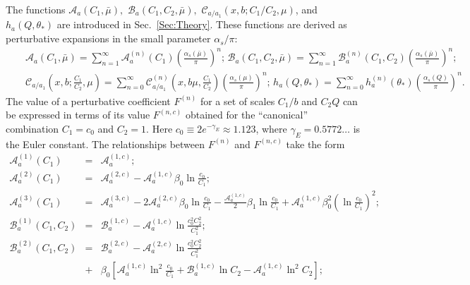 \documentclass[12pt,english,aps,preprint,prd,letterpaper,fleqn,nofootinbib,showpacs,showkeys,tightenlines,floatfix]{revtex4}
\begin{document}
{The functions $\mathcal{A}_{a}(C_{1},\bar{\mu}),$ $\mathcal{B}_{a}(C_{1},C_{2},\bar{\mu}),$
$\mathcal{C}_{a/a_{1}}(x,b;C_{1}/C_{2},\mu)$, and $h_{a}(Q,\theta_{*})$
are introduced in Sec.~\ref{Sec:Theory}. These functions are derived
as perturbative expansions in the small parameter $\alpha_{s}/\pi$:\begin{eqnarray*}
 &  & \mathcal{A}_{a}(C_{1},\bar{\mu})=\sum_{n=1}^{\infty}\mathcal{A}_{a}^{(n)}(C_{1})\left(\frac{\alpha_{s}(\bar{\mu})}{\pi}\right)^{n};\,\mathcal{B}_{a}(C_{1},C_{2},\bar{\mu})=\sum_{n=1}^{\infty}\mathcal{B}_{a}^{(n)}(C_{1},C_{2})\left(\frac{\alpha_{s}(\bar{\mu})}{\pi}\right)^{n};\\
 &  & \mathcal{C}_{a/a_{1}}\left(x,b;\frac{C_{1}}{C_{2}},\mu\right)=\sum_{n=0}^{\infty}\mathcal{C}_{a/a_{1}}^{(n)}(x,b\mu,\frac{C_{1}}{C_{2}})\left(\frac{\alpha_{s}(\mu)}{\pi}\right)^{n};\, h_{a}(Q,\theta_{*})=\sum_{n=0}^{\infty}h_{a}^{(n)}(\theta_{*})\left(\frac{\alpha_{s}(Q)}{\pi}\right)^{n}.\end{eqnarray*}
 The value of a perturbative coefficient $F^{(n)}$ for a set of scales
$C_{1}/b$ and $C_{2}Q$ can be expressed in terms of its value $F^{(n,c)}$
obtained for the {}``canonical'' combination $C_{1}=c_{0}$ and
$C_{2}=1.$ Here $c_{0}\equiv2e^{-\gamma_{E}}\approx1.123$, where $\gamma_{E}=0.5772\dots$ 
is the Euler constant.  The
relationships between $F^{(n)}$ and $F^{(n,c)}$ take the form \begin{eqnarray}
\mathcal{A}_{a}^{(1)}(C_{1}) & = & \mathcal{{\mathcal{A}}}_{a}^{(1,c)};\\
\mathcal{A}_{a}^{(2)}(C_{1}) & = & \mathcal{{\mathcal{A}}}_{a}^{(2,c)}-\mathcal{{\mathcal{A}}}_{a}^{(1,c)}\beta_{0}\ln\frac{c_{0}}{C_{1}};\\
\mathcal{A}_{a}^{(3)}(C_{1}) & = & \mathcal{A}_{a}^{(3,c)}-2\mathcal{A}_{a}^{(2,c)}\beta_{0}\ln\frac{c_{0}}{C_{1}}-\frac{\mathcal{A}_{a}^{(1,c)}}{2}\beta_{1}\ln\frac{c_{0}}{C_{1}}+\mathcal{A}_{a}^{(1,c)}\beta_{0}^{2}\left(\ln\frac{c_{0}}{C_{1}}\right)^{2};\\
\mathcal{B}_{a}^{(1)}(C_{1},C_{2}) & = & \mathcal{B}_{a}^{(1,c)}-\mathcal{A}_{a}^{(1,c)}\ln\frac{c_{0}^{2}C_{2}^{2}}{C_{1}^{2}};\\
\mathcal{B}_{a}^{(2)}(C_{1},C_{2}) & = & \mathcal{B}_{a}^{(2,c)}-\mathcal{{\mathcal{A}}}_{a}^{(2,c)}\ln\frac{c_{0}^{2}C_{2}^{2}}{C_{1}^{2}}\nonumber \\
 & + & \beta_{0}\left[\mathcal{{\mathcal{A}}}_{a}^{(1,c)}\ln^{2}\frac{c_{0}}{C_{1}}+\mathcal{B}_{a}^{(1,c)}\ln C_{2}-\mathcal{{\mathcal{A}}}_{a}^{(1,c)}\ln^{2}C_{2}\right];\\

\end{eqnarray}}
\end{document}
